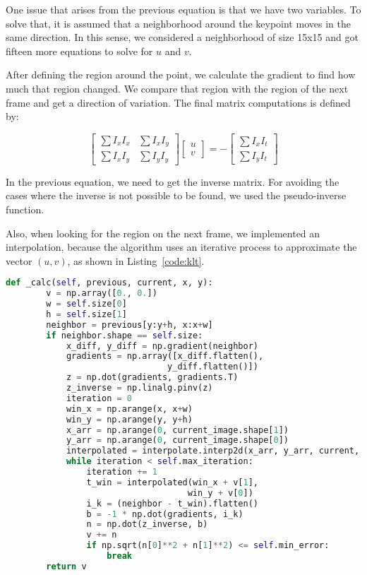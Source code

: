 \documentclass[]{IEEEtran}
\begin{document}
One issue that arises from the previous equation is that we have two variables. To solve that, it is assumed that a neighborhood around the keypoint moves in the same direction. In this sense, we considered a neighborhood of size 15x15 and got fifteen more equations to solve for $u$ and $v$.

After defining the region around the point, we calculate the gradient to find how much that region changed. We compare that region with the region of the next frame and get a direction of variation. The final matrix computations is defined by:

\begin{equation}
\begin{bmatrix}
\sum{I_x I_x} & \sum{I_x I_y} \\ 
 \sum{I_x I_y}  & \sum{I_y I_y} 
\end{bmatrix} \begin{bmatrix}
u \\ v
\end{bmatrix}
= -
\begin{bmatrix}
\sum{I_x I_t} \\ 
\sum{I_y I_t}
\end{bmatrix}
\end{equation}

In the previous equation, we need to get the inverse matrix. For avoiding the cases where the inverse is not possible to be found, we used the pseudo-inverse function. 

Also, when looking for the region on the next frame, we implemented an interpolation, because the algorithm uses an iterative process to approximate the vector $(u, v)$, as shown in Listing~\ref{code:klt}.

\begin{lstlisting}[language=Python, caption={Kanade-Lucas-Tomasi Tracking Algorithm.}, label={code:klt}]
 def _calc(self, previous, current, x, y):
        v = np.array([0., 0.])
        w = self.size[0]
        h = self.size[1]
        neighbor = previous[y:y+h, x:x+w]
        if neighbor.shape == self.size:
            x_diff, y_diff = np.gradient(neighbor)
            gradients = np.array([x_diff.flatten(),
                                y_diff.flatten()])
            z = np.dot(gradients, gradients.T)
            z_inverse = np.linalg.pinv(z)
            iteration = 0
            win_x = np.arange(x, x+w)
            win_y = np.arange(y, y+h)
            x_arr = np.arange(0, current_image.shape[1])
            y_arr = np.arange(0, current_image.shape[0])
            interpolated = interpolate.interp2d(x_arr, y_arr, current, kind='cubic')
            while iteration < self.max_iteration:
                iteration += 1
                t_win = interpolated(win_x + v[1],
                                    win_y + v[0])
                i_k = (neighbor - t_win).flatten()
                b = -1 * np.dot(gradients, i_k)
                n = np.dot(z_inverse, b)
                v += n
                if np.sqrt(n[0]**2 + n[1]**2) <= self.min_error:
                    break
        return v
\end{lstlisting}
\end{document}
